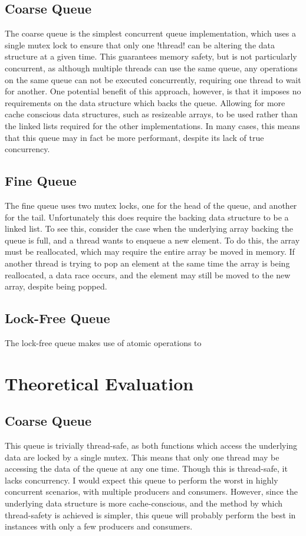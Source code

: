 \documentclass{article}
\begin{document}
\subsection{Coarse Queue}
The coarse queue is the simplest concurrent queue implementation, which uses a
single mutex lock to ensure that only one !thread! can be altering the data
structure at a given time. This guarantees memory safety, but is not
particularly concurrent, as although multiple threads can use the same queue,
any operations on the same queue can not be executed concurrently, requiring one
thread to wait for another. One potential benefit of this approach, however, is
that it imposes no requirements on the data structure which backs the queue.
Allowing for more cache conscious data structures, such as resizeable arrays, to
be used rather than the linked lists required for the other implementations. In
many cases, this means that this queue may in fact be more performant, despite
its lack of true concurrency.

\subsection{Fine Queue}
The fine queue uses two mutex locks, one for the head of the queue, and another
for the tail. Unfortunately this does require the backing data structure to be a
linked list. To see this, consider the case when the underlying array backing
the queue is full, and a thread wants to enqueue a new element. To do this, the
array must be reallocated, which may require the entire array be moved in
memory. If another thread is trying to pop an element at the same time the array
is being reallocated, a data race occurs, and the element may still be moved to
the new array, despite being popped.

\subsection{Lock-Free Queue}
The lock-free queue makes use of atomic operations to

\section{Theoretical Evaluation}
\subsection{Coarse Queue}
This queue is trivially thread-safe, as both functions which access the
underlying data are locked by a single mutex. This means that only one thread
may be accessing the data of the queue at any one time. Though this is
thread-safe, it lacks concurrency. I would expect this queue to perform the
worst in highly concurrent scenarios, with multiple producers and consumers.
However, since the underlying data structure is more cache-conscious, and the
method by which thread-safety is achieved is simpler, this queue will probably
perform the best in instances with only a few producers and consumers.
\end{document}
